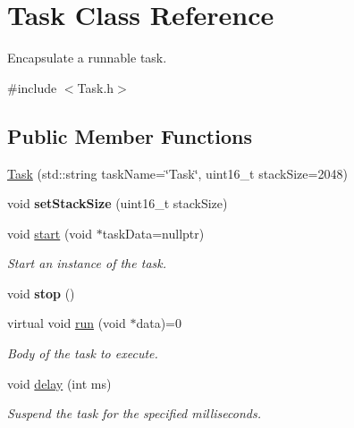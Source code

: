 \hypertarget{class_task}{}\section{Task Class Reference}
\label{class_task}


Encapsulate a runnable task.  




{\ttfamily \#include $<$Task.\+h$>$}

\subsection*{Public Member Functions}
\begin{DoxyCompactItemize}
\item 
\hyperlink{class_task_a741a3d88d5bd7d5b879555b8bb6db6ec}{Task} (std\+::string task\+Name=\char`\"{}Task\char`\"{}, uint16\+\_\+t stack\+Size=2048)
\item 
void {\bfseries set\+Stack\+Size} (uint16\+\_\+t stack\+Size)\hypertarget{class_task_afe0f5594c56b8cc7ac96c2198d5d81b4}{}\label{class_task_afe0f5594c56b8cc7ac96c2198d5d81b4}

\item 
void \hyperlink{class_task_a6f13d13787e21dc929b61d112b863433}{start} (void $\ast$task\+Data=nullptr)
\begin{DoxyCompactList}\small\item\em Start an instance of the task. \end{DoxyCompactList}\item 
void {\bfseries stop} ()\hypertarget{class_task_aba5eb3d6c2a034aa0e319383fbec68c4}{}\label{class_task_aba5eb3d6c2a034aa0e319383fbec68c4}

\item 
virtual void \hyperlink{class_task_a399f60ad8cd91d34dba2de57b4ac6d65}{run} (void $\ast$data)=0
\begin{DoxyCompactList}\small\item\em Body of the task to execute. \end{DoxyCompactList}\item 
void \hyperlink{class_task_aa4b603c866f4b8e0f0c6b524bb0e287e}{delay} (int ms)
\begin{DoxyCompactList}\small\item\em Suspend the task for the specified milliseconds. \end{DoxyCompactList}\end{DoxyCompactItemize}


